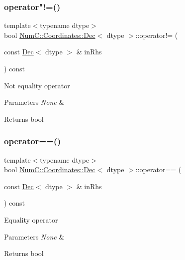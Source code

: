 \subsubsection{\texorpdfstring{operator"!=()}{operator!=()}}
{\footnotesize\ttfamily template$<$typename dtype$>$ \\
bool \mbox{\hyperlink{class_num_c_1_1_coordinates_1_1_dec}{Num\+C\+::\+Coordinates\+::\+Dec}}$<$ dtype $>$\+::operator!= (\begin{DoxyParamCaption}\item[{const \mbox{\hyperlink{class_num_c_1_1_coordinates_1_1_dec}{Dec}}$<$ dtype $>$ \&}]{in\+Rhs }\end{DoxyParamCaption}) const\hspace{0.3cm}{\ttfamily [inline]}}

Not equality operator


\begin{DoxyParams}{Parameters}
{\em None} & \\
\hline
\end{DoxyParams}
\begin{DoxyReturn}{Returns}
bool 
\end{DoxyReturn}
\mbox{\label{class_num_c_1_1_coordinates_1_1_dec_a521e4249b53eb9bd38ca9cf53e37287c}} 
\subsubsection{\texorpdfstring{operator==()}{operator==()}}
{\footnotesize\ttfamily template$<$typename dtype$>$ \\
bool \mbox{\hyperlink{class_num_c_1_1_coordinates_1_1_dec}{Num\+C\+::\+Coordinates\+::\+Dec}}$<$ dtype $>$\+::operator== (\begin{DoxyParamCaption}\item[{const \mbox{\hyperlink{class_num_c_1_1_coordinates_1_1_dec}{Dec}}$<$ dtype $>$ \&}]{in\+Rhs }\end{DoxyParamCaption}) const\hspace{0.3cm}{\ttfamily [inline]}}

Equality operator


\begin{DoxyParams}{Parameters}
{\em None} & \\
\hline
\end{DoxyParams}
\begin{DoxyReturn}{Returns}
bool 
\end{DoxyReturn}
\mbox{\label{class_num_c_1_1_coordinates_1_1_dec_adfbf0ebc20849e410e0332f1286d2687}} 
